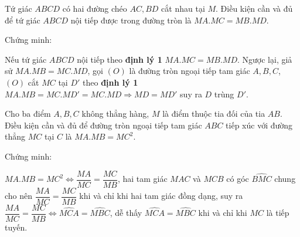 \begin{dang}
	\begin{dl}
		Tứ giác $ABCD$ có hai đường chéo $AC,BD$ cắt nhau tại $M$. Điều kiện cần và đủ để tứ giác $ABCD$ nội tiếp được trong đường tròn là $MA.MC=MB.MD$. 
	\end{dl}
	Chứng minh: 
	\begin{center}
	\end{center}
	Nếu tứ giác $ABCD$ nội tiếp theo \textbf{định lý 1} $MA.MC=MB.MD$. Ngược lại, giả sử $MA.MB=MC.MD$, gọi $(O)$ là đường tròn ngoại tiếp tam giác $A,B,C$, $(O)$ cắt $MC$ tại $D'$ theo \textbf{định lý 1} $MA.MB=MC.MD' = MC.MD\Rightarrow  MD=MD'$ suy ra $D$ trùng $D'$.
	\begin{dl}
		Cho ba điểm $A,B,C$ không thẳng hàng, $M$ là điểm thuộc tia đối của tia $AB$. Điều kiện cần và đủ để đường tròn ngoại tiếp tam giác $ABC$ tiếp xúc với đường thẳng $MC$ tại $C$ là  $MA.MB=MC^2$.
	\end{dl}
	Chứng minh: 
	\begin{center}
	\end{center}
	$MA.MB=MC^2 \Leftrightarrow  \dfrac{MA}{MC} = \dfrac{MC}{MB}$,  hai tam giác $MAC$ và $MCB$ có góc $\widehat{BMC}$ chung cho nên $\dfrac{MA}{MC} = \dfrac{MC}{MB}$ khi và chỉ khi hai tam giác đồng dạng,  suy ra $\dfrac{MA}{MC} = \dfrac{MC}{MB} \Leftrightarrow \widehat{MCA} =\widehat{MBC} $, dễ thấy $\widehat{MCA} =\widehat{MBC}$ khi và chỉ khi $MC$ là tiếp tuyến.
	

\end{dang}
